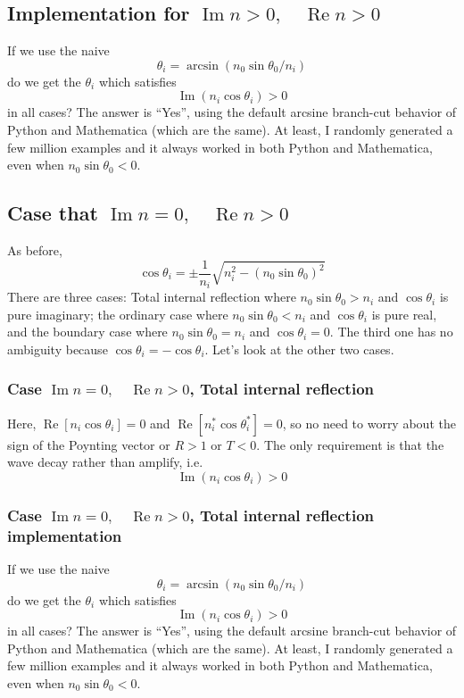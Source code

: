 \documentclass[12pt]{article}
\renewcommand{\(}{\left(}
\renewcommand{\)}{\right)}
\renewcommand{\Im}{\operatorname{Im}}
\renewcommand{\Re}{\operatorname{Re}}
\begin{document}
\subsection{Implementation for $\Im n>0, \quad \Re n >0$}
If we use the naive
$$\theta_i = \arcsin(n_0 \sin \theta_0 / n_i)$$
do we get the $\theta_i$ which satisfies
$$\Im(n_i \cos \theta_i)>0$$
in all cases? The answer is ``Yes'', using the default arcsine branch-cut behavior of Python and Mathematica (which are the same). At least, I randomly generated a few million examples and it always worked in both Python and Mathematica, even when $n_0\sin\theta_0<0$.

\subsection{Case that $\Im n=0, \quad \Re n > 0$}
As before,
$$\cos \theta_i = \pm \frac{1}{n_i} \sqrt{n_i^2 - (n_0 \sin \theta_0)^2}$$
There are three cases: Total internal reflection where $n_0\sin\theta_0>n_i$ and $\cos \theta_i$ is pure imaginary; the ordinary case where $n_0 \sin \theta_0 < n_i$ and $\cos \theta_i$ is pure real, and the boundary case where $n_0 \sin \theta_0 = n_i$ and $\cos \theta_i = 0$. The third one has no ambiguity because $\cos \theta_i = -\cos \theta_i$. Let's look at the other two cases.

\subsubsection{Case $\Im n=0, \quad \Re n > 0$, Total internal reflection}
Here, $\Re[n_i \cos\theta_i] = 0$ and $\Re [n_i^* \cos \theta_i^*]=0$, so no need to worry about the sign of the Poynting vector or $R>1$ or $T<0$. The only requirement is that the wave decay rather than amplify, i.e.
$$\Im(n_i \cos \theta_i)>0$$

\subsubsection{Case $\Im n=0, \quad \Re n > 0$, Total internal reflection implementation}
If we use the naive
$$\theta_i = \arcsin(n_0 \sin \theta_0 / n_i)$$
do we get the $\theta_i$ which satisfies
$$\Im(n_i \cos \theta_i)>0$$
in all cases? The answer is ``Yes'', using the default arcsine branch-cut behavior of Python and Mathematica (which are the same). At least, I randomly generated a few million examples and it always worked in both Python and Mathematica, even when $n_0\sin\theta_0<0$.
\end{document}
